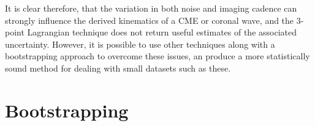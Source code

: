 \documentclass[structabstract]{aa}
\begin{document}


It is clear therefore, that the variation in both noise and imaging cadence can strongly influence the derived kinematics of a CME or coronal wave, and the 3-point Lagrangian technique does not return useful estimates of the associated uncertainty. However, it is possible to use other techniques along with a bootstrapping approach to overcome these issues, an produce a more statistically sound method for dealing with small datasets such as these. 



\section{Bootstrapping}
\label{sect:bootstrapping}
\end{document}
